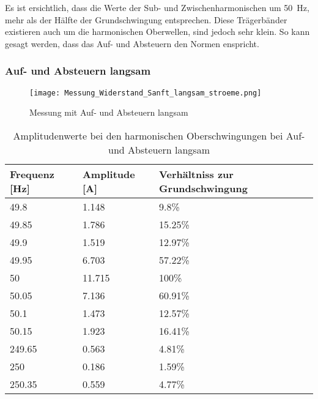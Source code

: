 Es ist ersichtlich, dass die Werte der Sub- und Zwischenharmonischen um \SI{50}{Hz}, mehr als der Hälfte der Grundschwingung entsprechen. Diese Trägerbänder existieren auch um die harmonischen Oberwellen, sind jedoch sehr klein. So kann gesagt werden, dass das Auf- und Absteuern den Normen enspricht.


\newpage
\subsubsection*{Auf- und Absteuern langsam}\label{sec:Sanft_Widerstand_stroeme}
\begin{figure}[ht!]
	\centering
	\texttt{[image: Messung\_Widerstand\_Sanft\_langsam\_stroeme.png]}	
	\caption{Messung mit Auf- und Absteuern langsam}\label{fig:Mess_Widerstand_Sanft_langsam_stroeme}
\end{figure}

\begin{table}[ht!]
	\centering
	\begin{tabular}{|l|l|l|}
		\hline
		Frequenz {[}Hz{]} & Amplitude {[}A{]} & Verhältniss zur Grundschwingung	\\ \hline
		49.8              & 1.148             & 9.8\%							\\ \hline
		49.85             & 1.786             & 15.25\%							\\ \hline
		49.9              & 1.519             & 12.97\%							\\ \hline
		49.95             & 6.703             & 57.22\%							\\ \hline
		50                & 11.715            & 100\%							\\ \hline
		50.05             & 7.136             & 60.91\%							\\ \hline
		50.1              & 1.473             & 12.57\%							\\ \hline
		50.15             & 1.923             & 16.41\%							\\ \hline
		249.65            & 0.563             & 4.81\%							\\ \hline
		250               & 0.186             & 1.59\%							\\ \hline
		250.35            & 0.559             & 4.77\%							\\ \hline
	\end{tabular}
	\caption{Amplitudenwerte bei den harmonischen Oberschwingungen bei Auf- und Absteuern langsam}\label{tab:Sanft_langsam_stroeme}
\end{table}

